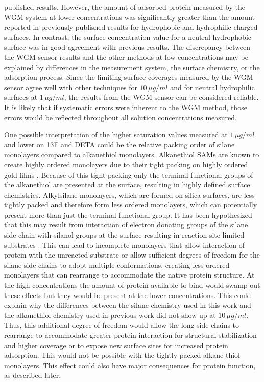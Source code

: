published results. However, the amount of adsorbed protein measured
by the WGM system at lower concentrations was significantly greater
than the amount reported in previously published results for hydrophobic
and hydrophilic charged surfaces. In contrast, the surface concentration
value for a neutral hydrophobic surface was in good agreement with
previous results. The discrepancy between the WGM sensor results and
the other methods at low concentrations may be explained by differences
in the measurement system, the surface chemistry, or the adsorption
process. Since the limiting surface coverages measured by the WGM
sensor agree well with other techniques for $10\,\mu g/ml$ and for
neutral hydrophilic surfaces at $1\,\mu g/ml$, the results from the
WGM sensor can be considered reliable. It is likely that if systematic
errors were inherent to the WGM method, those errors would be reflected
throughout all solution concentrations measured. 

One possible interpretation of the higher saturation values measured
at $1\,\mu g/ml$ and lower on 13F and DETA could be the relative
packing order of silane monolayers compared to alkanethiol monolayers.
Alkanethiol SAMs are known to create highly ordered monolayers due
to their tight packing on highly ordered gold films \cite{Prime1991}.
Because of this tight packing only the terminal functional groups
of the alkanethiol are presented at the surface, resulting in highly
defined surface chemistries. Alkylsilane monolayers, which are formed
on silica surfaces, are less tightly packed and therefore form less
ordered monolayers, which can potentially present more than just the
terminal functional group. It has been hypothesized that this may
result from interaction of electron donating groups of the silane
side chain with silanol groups at the surface resulting in reaction
site-limited substrates \cite{Stenger1992}. This can lead to incomplete
monolayers that allow interaction of protein with the unreacted substrate
or allow sufficient degrees of freedom for the silane side-chains
to adopt multiple conformations, creating less ordered monolayers
that can rearrange to accommodate the native protein structure. At
the high concentrations the amount of protein available to bind would
swamp out these effects but they would be present at the lower concentrations.
This could explain why the differences between the silane chemistry
used in this work and the alkanethiol chemistry used in previous work
\cite{Keselowsky2003} did not show up at $10\,\mu g/ml$. Thus, this
additional degree of freedom would allow the long side chains to rearrange
to accommodate greater protein interaction for structural stabilization
and higher coverage or to expose new surface sites for increased protein
adsorption. This would not be possible with the tightly packed alkane
thiol monolayers. This effect could also have major consequences for
protein function, as described later. 

